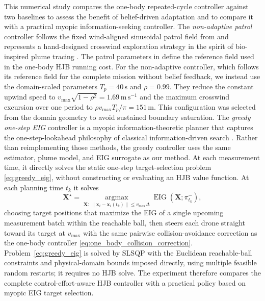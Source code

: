 \documentclass{article}
\newcommand{\x}{\mathbf{x}}
\newcommand{\bX}{\mathbf{X}}
\begin{document}
This numerical study compares the one-body repeated-cycle controller against two baselines to assess the benefit of belief-driven adaptation and to compare it with a practical myopic information-seeking controller.
The \emph{non-adaptive patrol} controller follows the fixed wind-aligned sinusoidal patrol field from  and represents a hand-designed crosswind exploration strategy in the spirit of bio-inspired plume tracing \cite{kennedy83zigzagging,li2001crosswindimportance}.
The patrol parameters in  define the reference field used in the one-body HJB running cost.
For the non-adaptive controller, which follows its reference field for the complete mission without belief feedback, we instead use the domain-scaled parameters $T_p=40\,\mathrm{s}$ and $\rho=0.99$.
They reduce the constant upwind speed to $v_{\max}\sqrt{1-\rho^2}=1.69\,\mathrm{m\,s^{-1}}$ and the maximum crosswind excursion over one period to $\rho v_{\max}T_p/\pi=151\,\mathrm{m}$.
This configuration was selected from the domain geometry to avoid sustained boundary saturation.
The \emph{greedy one-step EIG} controller is a myopic information-theoretic planner that captures the one-step-lookahead philosophy of classical information-driven search \cite{vergassola2007infotaxis,hutchinson2019control}.
Rather than reimplementing those methods, the greedy controller uses the same estimator, plume model, and EIG surrogate as our method.
At each measurement time, it directly solves the static one-step target-selection problem \eqref{eq:greedy_eig}, without constructing or evaluating an HJB value function.
At each planning time $t_k$ it solves
\begin{equation}
\label{eq:greedy_eig}
\bX^\star = \operatorname*{argmax}_{\bX:\,\|\x_i - \x_i(t_k)\|\le v_{\max}\Delta}
\operatorname{EIG}(\bX;\pi_{t_k}^-),
\end{equation}
choosing target positions that maximize the EIG of a single upcoming measurement batch within the reachable ball, then steers each drone straight toward its target at $v_{\max}$ with the same pairwise collision-avoidance correction as the one-body controller \eqref{eq:one_body_collision_correction}.
Problem~\eqref{eq:greedy_eig} is solved by SLSQP with the Euclidean reachable-ball constraints and physical-domain bounds imposed directly, using multiple feasible random restarts; it requires no HJB solve.
The experiment therefore compares the complete control-effort-aware HJB controller with a practical policy based on myopic EIG target selection.
\end{document}
